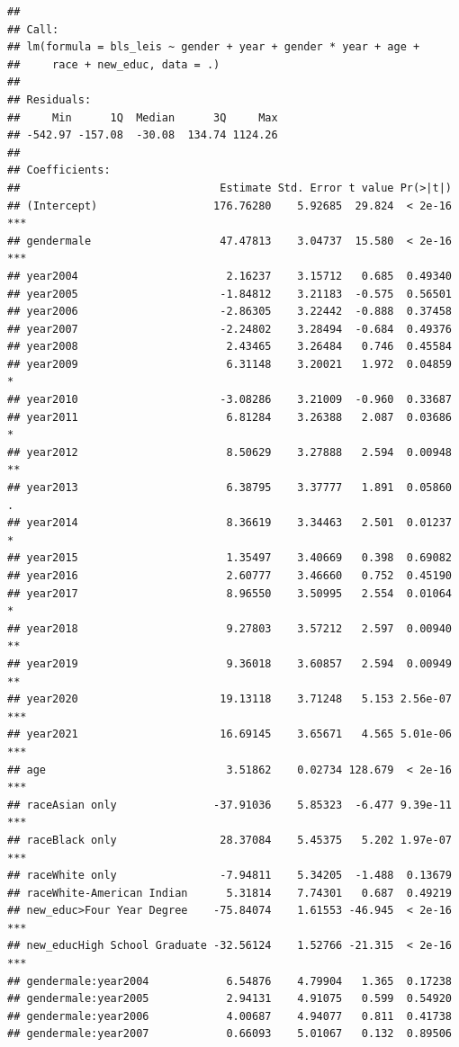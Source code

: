 \documentclass[
]{article}
\begin{document}
\begin{verbatim}
## 
## Call:
## lm(formula = bls_leis ~ gender + year + gender * year + age + 
##     race + new_educ, data = .)
## 
## Residuals:
##     Min      1Q  Median      3Q     Max 
## -542.97 -157.08  -30.08  134.74 1124.26 
## 
## Coefficients:
##                               Estimate Std. Error t value Pr(>|t|)    
## (Intercept)                  176.76280    5.92685  29.824  < 2e-16 ***
## gendermale                    47.47813    3.04737  15.580  < 2e-16 ***
## year2004                       2.16237    3.15712   0.685  0.49340    
## year2005                      -1.84812    3.21183  -0.575  0.56501    
## year2006                      -2.86305    3.22442  -0.888  0.37458    
## year2007                      -2.24802    3.28494  -0.684  0.49376    
## year2008                       2.43465    3.26484   0.746  0.45584    
## year2009                       6.31148    3.20021   1.972  0.04859 *  
## year2010                      -3.08286    3.21009  -0.960  0.33687    
## year2011                       6.81284    3.26388   2.087  0.03686 *  
## year2012                       8.50629    3.27888   2.594  0.00948 ** 
## year2013                       6.38795    3.37777   1.891  0.05860 .  
## year2014                       8.36619    3.34463   2.501  0.01237 *  
## year2015                       1.35497    3.40669   0.398  0.69082    
## year2016                       2.60777    3.46660   0.752  0.45190    
## year2017                       8.96550    3.50995   2.554  0.01064 *  
## year2018                       9.27803    3.57212   2.597  0.00940 ** 
## year2019                       9.36018    3.60857   2.594  0.00949 ** 
## year2020                      19.13118    3.71248   5.153 2.56e-07 ***
## year2021                      16.69145    3.65671   4.565 5.01e-06 ***
## age                            3.51862    0.02734 128.679  < 2e-16 ***
## raceAsian only               -37.91036    5.85323  -6.477 9.39e-11 ***
## raceBlack only                28.37084    5.45375   5.202 1.97e-07 ***
## raceWhite only                -7.94811    5.34205  -1.488  0.13679    
## raceWhite-American Indian      5.31814    7.74301   0.687  0.49219    
## new_educ>Four Year Degree    -75.84074    1.61553 -46.945  < 2e-16 ***
## new_educHigh School Graduate -32.56124    1.52766 -21.315  < 2e-16 ***
## gendermale:year2004            6.54876    4.79904   1.365  0.17238    
## gendermale:year2005            2.94131    4.91075   0.599  0.54920    
## gendermale:year2006            4.00687    4.94077   0.811  0.41738    
## gendermale:year2007            0.66093    5.01067   0.132  0.89506    

\end{verbatim}
\end{document}
